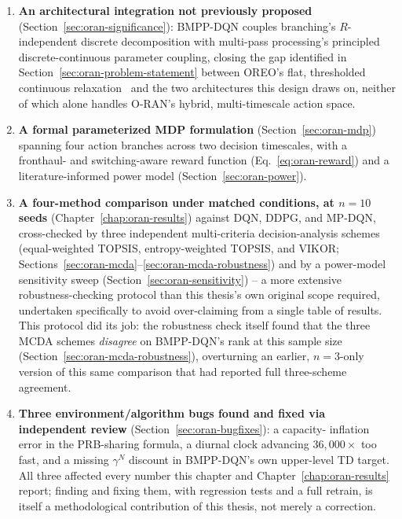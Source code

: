 \begin{enumerate}
  \item \textbf{An architectural integration not previously proposed}
    (Section~\ref{sec:oran-significance}): BMPP-DQN couples branching's
    $R$-independent discrete decomposition with multi-pass processing's
    principled discrete-continuous parameter coupling, closing the gap
    identified in Section~\ref{sec:oran-problem-statement} between OREO's
    flat, thresholded continuous relaxation~\cite{qazzaz2026oreo} and the
    two architectures this design draws on, neither of which alone handles
    O-RAN's hybrid, multi-timescale action space.
  \item \textbf{A formal parameterized MDP formulation}
    (Section~\ref{sec:oran-mdp}) spanning four action branches across two
    decision timescales, with a fronthaul- and switching-aware reward
    function (Eq.~\ref{eq:oran-reward}) and a literature-informed power
    model (Section~\ref{sec:oran-power}).
  \item \textbf{A four-method comparison under matched conditions, at
    $n=10$ seeds} (Chapter~\ref{chap:oran-results}) against DQN, DDPG, and
    MP-DQN, cross-checked by three independent multi-criteria
    decision-analysis schemes (equal-weighted TOPSIS, entropy-weighted
    TOPSIS, and VIKOR;
    Sections~\ref{sec:oran-mcda}--\ref{sec:oran-mcda-robustness}) and by a
    power-model sensitivity sweep
    (Section~\ref{sec:oran-sensitivity}) -- a more extensive
    robustness-checking protocol than this thesis's own original scope
    required, undertaken specifically to avoid over-claiming from a single
    table of results. This protocol did its job: the robustness check
    itself found that the three MCDA schemes \emph{disagree} on BMPP-DQN's
    rank at this sample size (Section~\ref{sec:oran-mcda-robustness}),
    overturning an earlier, $n=3$-only version of this same comparison
    that had reported full three-scheme agreement.
  \item \textbf{Three environment/algorithm bugs found and fixed via
    independent review} (Section~\ref{sec:oran-bugfixes}): a capacity-
    inflation error in the PRB-sharing formula, a diurnal clock advancing
    $36{,}000\times$ too fast, and a missing $\gamma^N$ discount in
    BMPP-DQN's own upper-level TD target. All three affected every number
    this chapter and Chapter~\ref{chap:oran-results} report; finding and
    fixing them, with regression tests and a full retrain, is itself a
    methodological contribution of this thesis, not merely a correction.

\end{enumerate}
